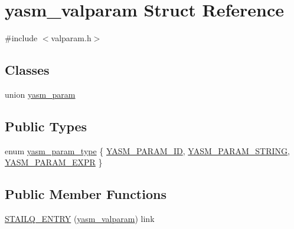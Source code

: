 \hypertarget{structyasm__valparam}{\section{yasm\-\_\-valparam Struct Reference}
\label{structyasm__valparam}
}


{\ttfamily \#include $<$valparam.\-h$>$}

\subsection*{Classes}
\begin{DoxyCompactItemize}
\item 
union \hyperlink{unionyasm__valparam_1_1yasm__param}{yasm\-\_\-param}
\end{DoxyCompactItemize}
\subsection*{Public Types}
\begin{DoxyCompactItemize}
\item 
enum \hyperlink{structyasm__valparam_a3eefe852f229cec9d65ada6450484b86}{yasm\-\_\-param\-\_\-type} \{ \hyperlink{structyasm__valparam_a3eefe852f229cec9d65ada6450484b86a197ce66261f2807125fcfdc84b3a9216}{Y\-A\-S\-M\-\_\-\-P\-A\-R\-A\-M\-\_\-\-I\-D}, 
\hyperlink{structyasm__valparam_a3eefe852f229cec9d65ada6450484b86a01c7e9e546590d4220f1b4ec31708118}{Y\-A\-S\-M\-\_\-\-P\-A\-R\-A\-M\-\_\-\-S\-T\-R\-I\-N\-G}, 
\hyperlink{structyasm__valparam_a3eefe852f229cec9d65ada6450484b86ac487b95792f51898be70ee14c0db0541}{Y\-A\-S\-M\-\_\-\-P\-A\-R\-A\-M\-\_\-\-E\-X\-P\-R}
 \}
\end{DoxyCompactItemize}
\subsection*{Public Member Functions}
\begin{DoxyCompactItemize}
\item 
\hyperlink{structyasm__valparam_a22274a9cbc7a5c5bc7591acdb8529105}{S\-T\-A\-I\-L\-Q\-\_\-\-E\-N\-T\-R\-Y} (\hyperlink{structyasm__valparam}{yasm\-\_\-valparam}) link
\end{DoxyCompactItemize}
